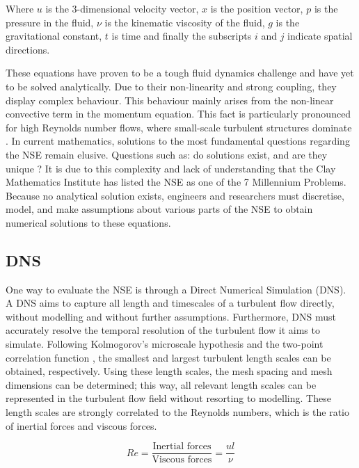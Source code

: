 Where $u$ is the 3-dimensional velocity vector, $x$ is the position vector, $p$ is the pressure in the fluid, $\nu$ is the kinematic viscosity of the fluid, $g$ is the gravitational constant, $t$ is time and finally the subscripts $i$ and $j$ indicate spatial directions.

These equations have proven to be a tough fluid dynamics challenge and have yet to be solved analytically. Due to their non-linearity and strong coupling, they display complex behaviour. This behaviour mainly arises from the non-linear convective term in the momentum equation. This fact is particularly pronounced for high Reynolds number flows, where small-scale turbulent structures dominate \cite{Turbulence}. In current mathematics, solutions to the most fundamental questions regarding the NSE remain elusive. Questions such as: do solutions exist, and are they unique \cite{clay_navierstokes}? It is due to this complexity and lack of understanding that the Clay Mathematics Institute has listed the NSE as one of the 7 Millennium Problems. Because no analytical solution exists, engineers and researchers must discretise, model, and make assumptions about various parts of the NSE to obtain numerical solutions to these equations. 

\subsection{DNS}
One way to evaluate the NSE is through a Direct Numerical Simulation (DNS). A DNS aims to capture all length and timescales of a turbulent flow directly, without modelling and without further assumptions. Furthermore, DNS must accurately resolve the temporal resolution of the turbulent flow it aims to simulate. Following Kolmogorov's microscale hypothesis \cite{Kolmogorov1941} and the two-point correlation function \cite{Pope2000}, the smallest and largest turbulent length scales can be obtained, respectively. Using these length scales, the mesh spacing and mesh dimensions can be determined; this way, all relevant length scales can be represented in the turbulent flow field without resorting to modelling. These length scales are strongly correlated to the Reynolds numbers, which is the ratio of inertial forces and viscous forces. 

\begin{equation}\label{eq: Reynoldsnr}
    Re = \frac{\text{Inertial forces}}{\text{Viscous forces}}= \frac{u l}{\nu}
\end{equation}

